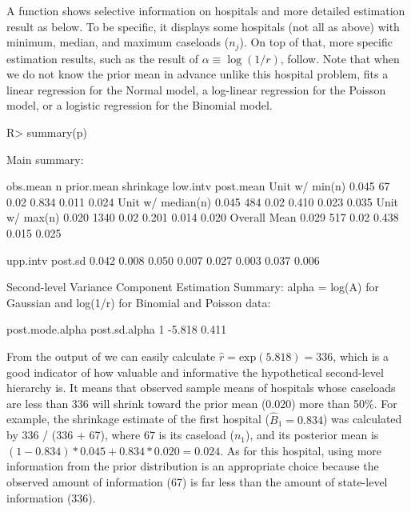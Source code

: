 \documentclass[article]{jss}
\begin{document}
A function  shows selective information on hospitals and more detailed estimation result as below. To be specific, it displays some hospitals (not all as above) with minimum, median, and maximum caseloads ($n_{j}$). On top of that, more specific estimation results, such as the result of $\alpha\equiv\log(1/r)$, follow. Note that when we do not know the prior mean in advance unlike this hospital problem,  fits a linear regression for the Normal model, a log-linear regression for the Poisson model, or a logistic regression for the Binomial model.
\begin{CodeChunk}
\begin{CodeInput}
R> summary(p)
\end{CodeInput}
\begin{CodeOutput}
Main summary:

                  obs.mean    n prior.mean shrinkage low.intv post.mean
Unit w/ min(n)       0.045   67       0.02     0.834    0.011     0.024
Unit w/ median(n)    0.045  484       0.02     0.410    0.023     0.035
Unit w/ max(n)       0.020 1340       0.02     0.201    0.014     0.020
Overall Mean         0.029  517       0.02     0.438    0.015     0.025

                  upp.intv post.sd
                     0.042   0.008
                     0.050   0.007
                     0.027   0.003
                     0.037   0.006

Second-level Variance Component Estimation Summary:
alpha = log(A) for Gaussian and log(1/r) for Binomial and Poisson data:

  post.mode.alpha post.sd.alpha
1          -5.818         0.411
\end{CodeOutput}
\end{CodeChunk}
From the output of  we can easily calculate $\hat{r}=\textrm{exp}(5.818)=336$, which is a good indicator of how valuable and informative the hypothetical second-level hierarchy is. It means that observed sample means of hospitals whose caseloads are less than 336 will shrink toward the prior mean (0.020) more than 50\%. For example, the shrinkage estimate of the first hospital ($\hat{B}_{1}= 0.834$) was calculated by 336 / (336 + 67), where 67 is its caseload ($n_{1}$), and its posterior mean is $(1-0.834)*0.045 + 0.834 * 0.020=0.024$. As for this hospital, using more information from the prior distribution is an appropriate choice because the observed amount of information (67) is far less than the amount of state-level information (336).
\end{document}
